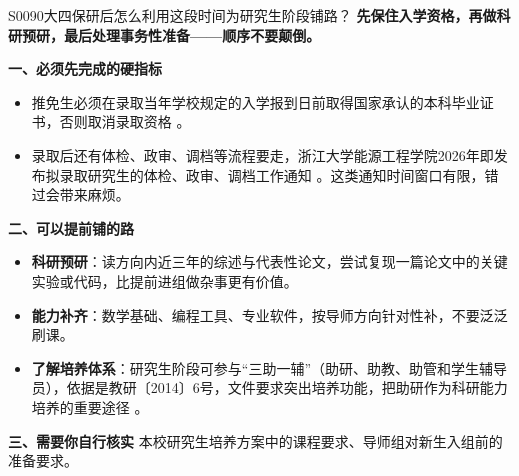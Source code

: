 \begin{qa}{S0090}{大四保研后怎么利用这段时间为研究生阶段铺路？}
\textbf{先保住入学资格，再做科研预研，最后处理事务性准备——顺序不要颠倒。}

\textbf{一、必须先完成的硬指标}
\begin{itemize}
  \item 推免生必须在录取当年学校规定的入学报到日前取得国家承认的本科毕业证书，否则取消录取资格 。
  \item 录取后还有体检、政审、调档等流程要走，浙江大学能源工程学院2026年即发布拟录取研究生的体检、政审、调档工作通知 。这类通知时间窗口有限，错过会带来麻烦。
\end{itemize}

\textbf{二、可以提前铺的路}
\begin{itemize}
  \item \textbf{科研预研}：读方向内近三年的综述与代表性论文，尝试复现一篇论文中的关键实验或代码，比提前进组做杂事更有价值。
  \item \textbf{能力补齐}：数学基础、编程工具、专业软件，按导师方向针对性补，不要泛泛刷课。
  \item \textbf{了解培养体系}：研究生阶段可参与“三助一辅”（助研、助教、助管和学生辅导员），依据是教研〔2014〕6号，文件要求突出培养功能，把助研作为科研能力培养的重要途径 。
\end{itemize}

\textbf{三、需要你自行核实}
本校研究生培养方案中的课程要求、导师组对新生入组前的准备要求。
\end{qa}

